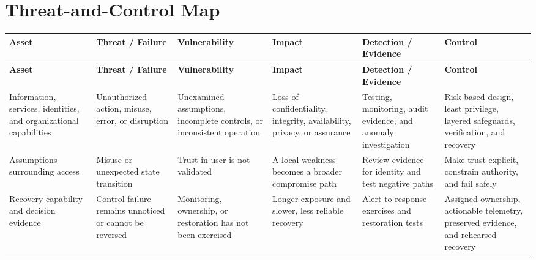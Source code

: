 \documentclass[11pt,letterpaper]{article}
\begin{document}
\section*{Threat-and-Control Map}
\begingroup\scriptsize\setlength{\tabcolsep}{2pt}
\begin{longtable}{>{\raggedright\arraybackslash}p{}>{\raggedright\arraybackslash}p{}>{\raggedright\arraybackslash}p{}>{\raggedright\arraybackslash}p{}>{\raggedright\arraybackslash}p{}>{\raggedright\arraybackslash}p{}}
\toprule\rowcolor{Navy}\color{white}\textbf{Asset} & \color{white}\textbf{Threat / Failure} & \color{white}\textbf{Vulnerability} & \color{white}\textbf{Impact} & \color{white}\textbf{Detection / Evidence} & \color{white}\textbf{Control}\\\midrule
\endfirsthead
\toprule\rowcolor{Navy}\color{white}\textbf{Asset} & \color{white}\textbf{Threat / Failure} & \color{white}\textbf{Vulnerability} & \color{white}\textbf{Impact} & \color{white}\textbf{Detection / Evidence} & \color{white}\textbf{Control}\\\midrule
\endhead
Information, services, identities, and organizational capabilities & Unauthorized action, misuse, error, or disruption & Unexamined assumptions, incomplete controls, or inconsistent operation & Loss of confidentiality, integrity, availability, privacy, or assurance & Testing, monitoring, audit evidence, and anomaly investigation & Risk-based design, least privilege, layered safeguards, verification, and recovery\\\midrule
Assumptions surrounding access & Misuse or unexpected state transition & Trust in user is not validated & A local weakness becomes a broader compromise path & Review evidence for identity and test negative paths & Make trust explicit, constrain authority, and fail safely\\\midrule
Recovery capability and decision evidence & Control failure remains unnoticed or cannot be reversed & Monitoring, ownership, or restoration has not been exercised & Longer exposure and slower, less reliable recovery & Alert-to-response exercises and restoration tests & Assigned ownership, actionable telemetry, preserved evidence, and rehearsed recovery\\\midrule
\bottomrule
\end{longtable}
\endgroup
\end{document}

